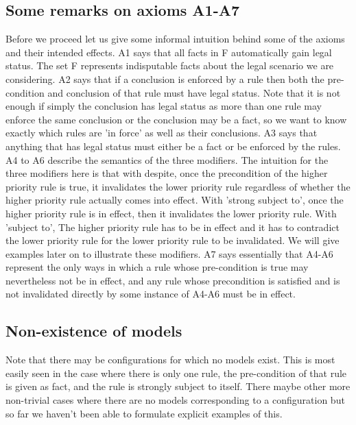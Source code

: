 \subsection{Some remarks on axioms A1-A7}
Before we proceed let us give some informal intuition behind some of the axioms and their intended effects. A1 says that all facts in F automatically gain legal status. The set F represents indisputable facts about the legal scenario we are considering. A2 says that if a conclusion is enforced by a rule then both the pre-condition and conclusion of that rule must have legal status. Note that it is not enough if simply the conclusion has legal status as more than one rule may enforce the same conclusion or the conclusion may be a fact, so we want to know exactly which rules are 'in force' as well as their conclusions. A3 says that anything that has legal status must either be a fact or be enforced by the rules. A4 to A6 describe the semantics of the three modifiers. The intuition for the three modifiers here is that with despite, once the precondition of the higher priority rule is true, it invalidates the lower priority rule regardless of whether the higher priority rule actually comes into effect. With 'strong subject to', once the higher priority rule is in effect, then it invalidates the lower priority rule. With 'subject to', The higher priority rule has to be in effect and it has to contradict the lower priority rule for the lower priority rule to be invalidated. We will give examples later on to illustrate these modifiers. A7 says essentially that A4-A6 represent the only ways in which a rule whose pre-condition is true may nevertheless not be in effect, and any rule whose precondition is satisfied and is not invalidated directly by some instance of A4-A6 must be in effect. 
\subsection{Non-existence of models}
Note that there may be configurations for which no models exist. This is most easily seen in the case where there is only one rule, the pre-condition of that rule is given as fact, and the rule is strongly subject to itself. There maybe other more non-trivial cases where there are no models corresponding to a configuration but so far we haven't been able to formulate explicit examples of this. 

